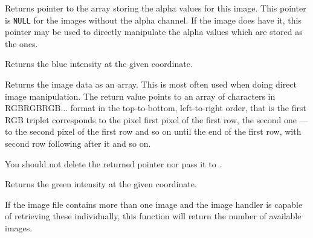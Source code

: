 Returns pointer to the array storing the alpha values for this image. This
pointer is {\tt NULL} for the images without the alpha channel. If the image
does have it, this pointer may be used to directly manipulate the alpha values
which are stored as the  ones.


\label{wximagegetblue}


Returns the blue intensity at the given coordinate.


\label{wximagegetdata}


Returns the image data as an array. This is most often used when doing
direct image manipulation. The return value points to an array of
characters in RGBRGBRGB$\ldots$ format in the top-to-bottom, left-to-right
order, that is the first RGB triplet corresponds to the pixel first pixel of
the first row, the second one --- to the second pixel of the first row and so
on until the end of the first row, with second row following after it and so
on.

You should not delete the returned pointer nor pass it to
.


\label{wximagegetgreen}


Returns the green intensity at the given coordinate.


\label{wximagegetimagecount}



If the image file contains more than one image and the image handler is capable 
of retrieving these individually, this function will return the number of
available images.



